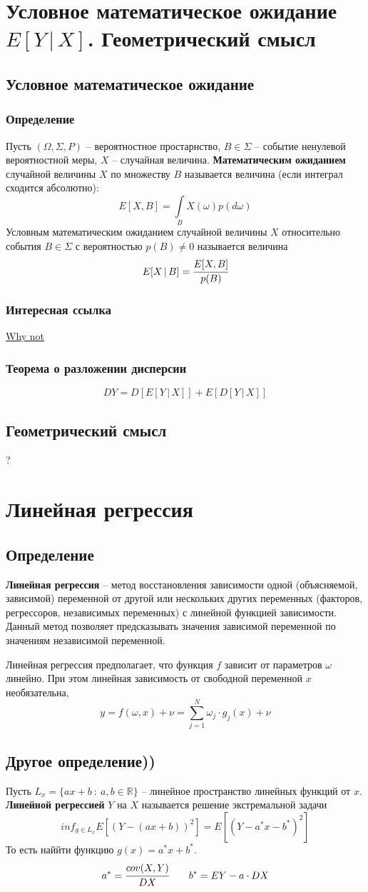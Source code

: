 \documentclass{article}
\newcommand{\R}{\mathbb{R}}
\begin{document}
\section{Условное математическое ожидание $E[Y\,|\,X]$. Геометрический смысл}
\subsection{Условное математическое ожидание}
\subsubsection{Определение}
Пусть $(\Omega,\Sigma,P)$ -- вероятностное простарнство, $B\in\Sigma$ -- событие ненулевой вероятностной меры, $X$ -- случайная величина. \textbf{Математическим ожиданием} случайной величины $X$ по множеству $B$ называется величина (если интеграл сходится абсолютно):
$$ E[X,B]=\int\limits_{B}X(\omega)p(d\omega) $$
Условным математическим ожиданием случайной величины $X$ относительно события $B\in\Sigma$ с вероятностью $p(B)\neq 0$ называется величина
$$ E[X\,|\,B]=\cfrac{E[X,B]}{p(B)} $$
\subsubsection{Интересная ссылка}
\href{https://eduardgorbunov.github.io/assets/files/Seminar07_675.pdf}{Why not}
\subsubsection{Теорема о разложении дисперсии}
$$ DY=D[E[Y\,|\,X]]+E[D[Y\,|\,X]] $$
\subsection{Геометрический смысл}
?
\newpage
\section{Линейная регрессия}
\subsection{Определение}
\textbf{Линейная регрессия} -- метод восстановления зависимости одной (объясняемой, зависимой) переменной от другой или нескольких других переменных (факторов, регрессоров, независимых переменных) с линейной функцией зависимости. Данный метод позволяет предсказывать значения зависимой переменной по значениям независимой переменной.

Линейная регрессия предполагает, что функция $f$ зависит от параметров $\omega$ линейно. При этом линейная зависимость от свободной переменной $x$ необязательна,
$$ y=f(\omega,x)+\nu=\sum_{j=1}^N \omega_j\cdot g_j(x)+\nu $$
\subsection{Другое определение))}
Пусть $L_x=\{ax+b\::\:a,b\in\R\}$ -- линейное пространство линейных функций от $x$. \textbf{Линейной регрессией} $Y$ на $X$ называется решение экстремальной задачи $$ inf_{g\in L_x} E[(Y-(ax+b))^2]=E[(Y-a^*x-b^*)^2] $$
То есть наййти функцию $g(x)=a^* x+b^*$.
$$ a^*=\cfrac{cov(X,Y)}{DX} \quad\quad b^*=EY-a\cdot DX $$
\end{document}
